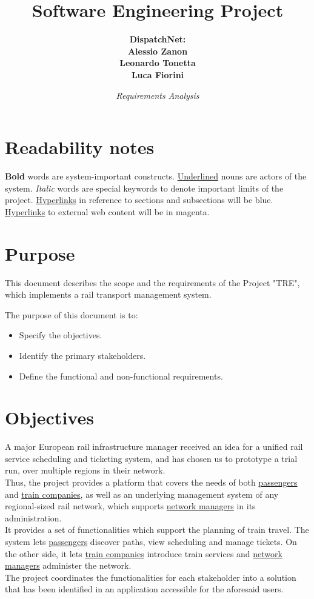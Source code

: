 \documentclass[12pt]{article}
\title{\bf{Software Engineering Project}}
\author{\bf{DispatchNet:} \\ Alessio Zanon \\ Leonardo Tonetta \\ Luca Fiorini}
\date{\it{Requirements Analysis}}
\renewcommand\bf[1]{\textbf{#1}}
\renewcommand\it[1]{\textit{#1}}
\newcommand\un[1]{\underline{#1}}
\begin{document}
\maketitle

\newpage
\tableofcontents \label{Contents}

\section*{Readability notes}
\bf{Bold} words are system-important constructs. \newline
\un{Underlined} nouns are actors of the system. \newline
\it{Italic} words are special keywords to denote important limits of the project. \newline
\hyperref[Contents]{Hyperlinks} in reference to sections and subsections will be blue. \newline
\href{https:\\www.google.com}{Hyperlinks} to external web content will be in magenta.
\newpage

\section*{Purpose}
This document describes the scope and the requirements of the Project "TRE", which implements a rail transport management system.

The purpose of this document is to: 
\begin{itemize}
	\item Specify the objectives.
	\item Identify the primary stakeholders.
	\item Define the functional and non-functional requirements.
\end{itemize}

\section{Objectives}

A major European rail infrastructure manager received an idea for a unified rail service scheduling and ticketing system, and has chosen us to prototype a trial run, over multiple regions in their network.\\

Thus, the project provides a platform that covers the needs of both \un{passengers} and \un{train companies}, as well as an underlying 
management system of any regional-sized rail network, which supports \un{network managers} in its administration. \\
It provides a set of functionalities which support the planning of train travel. The system lets \un{passengers} discover paths, view scheduling and manage tickets. On the other side, it lets \un{train companies} introduce train services and \un{network managers} administer the network.\\
The project coordinates the functionalities for each stakeholder into a solution that has been identified in an application accessible for the aforesaid users. \\
\end{document}
